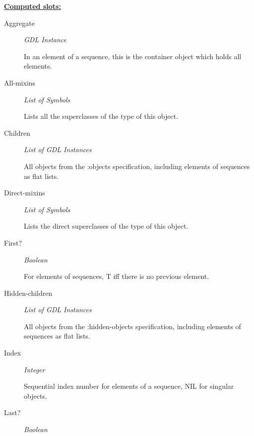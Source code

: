 \documentclass [11pt]{book}
\begin{document}
\begin{itemize}
\begin{description}
\end{description}






\textbf{
\underline{Computed slots:}}

\begin{description}

\item [Aggregate]
\emph{GDL Instance}

 In an element of a sequence, this is the container object which holds all elements.




\item [All-mixins]
\emph{List of Symbols}

 Lists all the superclasses of the type of this object.




\item [Children]
\emph{List of GDL Instances}

 All objects from the :objects specification, including elements of sequences
as flat lists.




\item [Direct-mixins]
\emph{List of Symbols}

 Lists the direct superclasses of the type of this object.




\item [First?]
\emph{Boolean}

 For elements of sequences, T iff there is no previous element.




\item [Hidden-children]
\emph{List of GDL Instances}

 All objects from the :hidden-objects specification, including elements of sequences
as flat lists.




\item [Index]
\emph{Integer}

 Sequential index number for elements of a sequence, NIL for singular objects.




\item [Last?]
\emph{Boolean}


\end{description}
\end{itemize}
\end{document}
